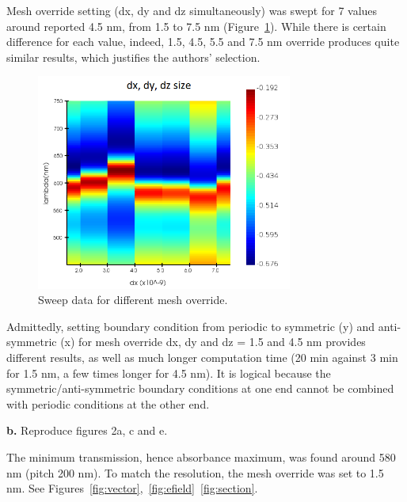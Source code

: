 \documentclass[11pt,a4paper]{article}
\begin{document}
Mesh override setting (dx, dy and dz simultaneously) was swept for 7 values around reported 4.5 nm, from 1.5 to 7.5 nm (Figure~\ref{fig:override}). While there is certain difference for each value, indeed, 1.5, 4.5, 5.5 and 7.5 nm override produces quite similar results, which justifies the authors' selection.

\begin{figure}
    \centering
    \includegraphics[width=0.75\textwidth]{override_size.png}
    \caption{Sweep data for different mesh override.}
    \label{fig:override}
\end{figure}

Admittedly, setting boundary condition from periodic to symmetric (y) and anti-symmetric (x) for mesh override dx, dy and dz = 1.5 and 4.5 nm provides different results, as well as much longer computation time (20 min against 3 min for 1.5 nm, a few times longer for 4.5 nm). It is logical because the symmetric/anti-symmetric boundary conditions at one end cannot be  combined with periodic conditions at the other end. 



\begin{displayquote}
    \textbf{b.} Reproduce figures 2a, c and e.
\end{displayquote}

The minimum transmission, hence absorbance maximum, was found around 580 nm (pitch 200 nm). To match the resolution, the mesh override was set to 1.5 nm.  
See Figures~\ref{fig:vector},~\ref{fig:efield}~\ref{fig:section}. 
\end{document}

